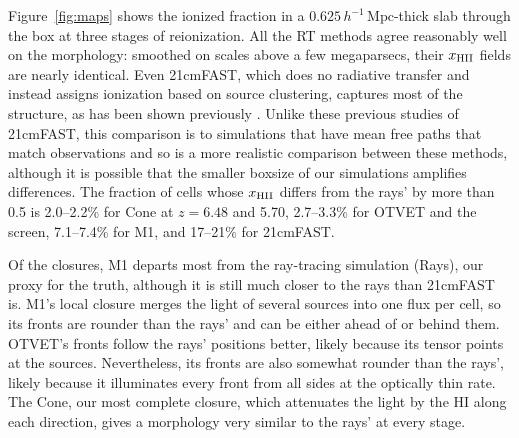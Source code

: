 \documentclass[iop]{openjournal}
\newcommand{\mpch}{\,h^{-1}\,\mathrm{Mpc}}
\begin{document}
Figure~\ref{fig:maps} shows the ionized fraction in a $0.625\mpch$-thick slab through the
box at three stages of reionization. All the RT methods agree reasonably well on the morphology: smoothed on scales above a few megaparsecs, their $x_{\rm HII}$ fields are
nearly identical. Even 21cmFAST, which does no radiative transfer and instead assigns ionization based on source clustering, captures most of the structure, as has been shown previously \citep{zahn07,zahn11,mesinger11}.  Unlike these previous studies of 21cmFAST, this comparison is to simulations that have mean free paths that match observations and so is a more realistic comparison between these methods, although it is possible that the smaller boxsize of our simulations amplifies differences. The fraction of cells whose $x_{\rm HII}$ differs from the rays' by more than 0.5 is 2.0--2.2\% for Cone at $z=6.48$ and 5.70, 2.7--3.3\% for OTVET and the screen, 7.1--7.4\% for M1, and 17--21\% for 21cmFAST. %

Of the closures, M1 departs most from the ray-tracing simulation (Rays), our proxy for the truth, although it is still much closer to the rays than 21cmFAST is. M1's local closure merges the
light of several sources into one flux per cell, so its
fronts are rounder than the rays' and can be either ahead of or behind them. OTVET's fronts follow the rays' positions better, likely because its tensor points at the sources. Nevertheless, its fronts are also
somewhat rounder than the rays', likely because it illuminates
every front from all sides at the optically thin rate. The Cone, our most complete closure, which attenuates the light by
the HI along each direction, gives a morphology very similar to the rays' at every stage.

\end{document}
